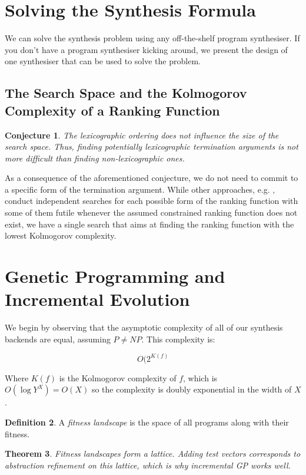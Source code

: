 \documentclass[preprint]{sigplanconf}
\newtheorem{theorem}{Theorem}
\newtheorem{conjecture}[theorem]{Conjecture}
\theoremstyle{definition}
\newtheorem{definition}[theorem]{Definition}
\begin{document}
\section{Solving the Synthesis Formula}
We can solve the synthesis problem using any off-the-shelf program synthesiser.  If you don't
have a program synthesiser kicking around, we present the design of one synthesiser
that can be used to solve the problem.

\subsection{The Search Space and the Kolmogorov Complexity of a Ranking Function}
\begin{conjecture}
The lexicographic ordering does not influence the size of the search space. Thus, finding potentially lexicographic termination arguments is not more difficult than finding non-lexicographic ones.   
\end{conjecture}

As a consequence of the aforementioned conjecture, we do not need to commit to a specific form of the termination argument. While other approaches, e.g. \cite{DBLP:conf/tacas/LeikeH14}, 
conduct independent searches for each possible form of the ranking function with some of them futile whenever the assumed constrained ranking function does not exist, we have a single search that aims at finding the ranking function with the lowest Kolmogorov complexity. 
 




\section{Genetic Programming and Incremental Evolution}

We begin by observing that the asymptotic complexity of all of our synthesis
backends are equal, assuming $P \neq NP$.  This complexity is:

$$O(2^{K(f)}$$

Where $K(f)$ is the Kolmogorov complexity of $f$, which is $O(\log Y^X) = O(X)$
so the complexity is doubly exponential in the width of $X$.

\begin{definition}
 A \emph{fitness landscape} is the space of all programs along with their fitness.
\end{definition}

\begin{theorem}
 Fitness landscapes form a lattice.  Adding test vectors corresponds to abstraction refinement on this
 lattice, which is why incremental GP works well.
\end{theorem}
\end{document}
